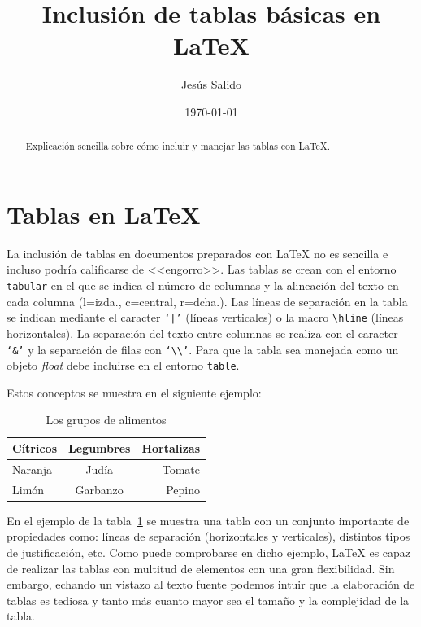 \documentclass[11pt,a4paper]{article}
\author{Jesús Salido}
\title{Inclusión de tablas básicas en \LaTeX{}}
\date{\today}
\begin{document}
\maketitle


\begin{abstract}
	Explicación sencilla sobre cómo incluir y manejar las tablas con \LaTeX{}.
\end{abstract}

\tableofcontents


\listoftables





\section{Tablas en \LaTeX{}}
La inclusión de tablas en documentos preparados con \LaTeX{} no es sencilla e incluso podría calificarse de <<engorro>>. Las tablas se crean con el entorno \texttt{tabular} en el que se indica el número de columnas y la alineación del texto en cada columna (l=izda., c=central, r=dcha.). Las líneas de separación en la tabla se indican mediante el caracter \texttt{`|'} (líneas verticales) o la macro \texttt{\textbackslash hline} (líneas horizontales). La separación del texto entre columnas se realiza con el caracter \texttt{`\&'} y la separación de filas con \texttt{`\textbackslash\textbackslash'}. Para que la tabla sea manejada como un objeto \emph{float} debe incluirse en el entorno \texttt{table}.

Estos conceptos se muestra en el siguiente ejemplo:

\begin{table}[hbt]%
	\centering
	\caption[Ejemplo de entorno \texttt{table}]{Los grupos de alimentos}		  \label{tab:alimentos}
	\begin{tabular}{| l | c | r | }
		\hline			
		\textbf{Cítricos} & \textbf{Legumbres} & \textbf{Hortalizas} \\ \hline \hline
		Naranja  & Judía     & Tomate \\ 
        \hline
		Limón    & Garbanzo  & Pepino \\ 
        \hline  
	\end{tabular}
\end{table}

En el ejemplo de la tabla~\ref{tab:alimentos} se muestra una tabla con un conjunto importante de propiedades como: líneas de separación (horizontales y verticales), distintos tipos de justificación, etc. Como puede comprobarse en dicho ejemplo, \LaTeX{} es capaz de realizar las tablas con multitud de elementos con una gran flexibilidad. Sin embargo, echando un vistazo al texto fuente podemos intuir que la elaboración de tablas es tediosa y tanto más cuanto mayor sea el tamaño y la complejidad de la tabla.
\end{document}

